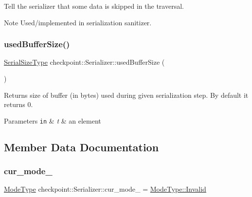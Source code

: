 Tell the serializer that some data is skipped in the traversal. 

\begin{DoxyNote}{Note}
Used/implemented in serialization sanitizer. 
\end{DoxyNote}
\mbox{\label{structcheckpoint_1_1_serializer_a9193aca9404eadbb6617273d0fb1343b}} 
\subsubsection{\texorpdfstring{used\+Buffer\+Size()}{usedBufferSize()}}
{\footnotesize\ttfamily \hyperlink{namespacecheckpoint_a083f6674da3f94c2901b18c6d238217c}{Serial\+Size\+Type} checkpoint\+::\+Serializer\+::used\+Buffer\+Size (\begin{DoxyParamCaption}{ }\end{DoxyParamCaption})\hspace{0.3cm}{\ttfamily [inline]}}



Returns size of buffer (in bytes) used during given serialization step. By default it returns 0. 


\begin{DoxyParams}[1]{Parameters}
\mbox{\tt in}  & {\em t} & an element \\
\hline
\end{DoxyParams}


\subsection{Member Data Documentation}
\mbox{\label{structcheckpoint_1_1_serializer_a89a1f207ad5ff75654cb6d48f432be37}} 
\subsubsection{\texorpdfstring{cur\+\_\+mode\+\_\+}{cur\_mode\_}}
{\footnotesize\ttfamily \hyperlink{namespacecheckpoint_ae2509499ccd8b1dc48fb535bf8aa3059}{Mode\+Type} checkpoint\+::\+Serializer\+::cur\+\_\+mode\+\_\+ = \hyperlink{namespacecheckpoint_ae2509499ccd8b1dc48fb535bf8aa3059a4bbb8f967da6d1a610596d7257179c2b}{Mode\+Type\+::\+Invalid}\hspace{0.3cm}{\ttfamily [protected]}}

